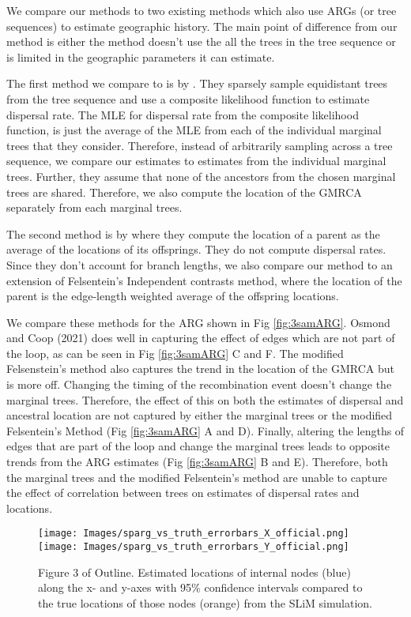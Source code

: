 We compare our methods to two existing methods which also use ARGs (or tree sequences) to estimate geographic history. The main point of difference from our method is either the method doesn't use the all the trees in the tree sequence or is limited in the geographic parameters it can estimate. 

The first method we compare to is by \cite{Osmond2021}. They sparsely sample equidistant trees from the tree sequence and use a composite likelihood function to estimate dispersal rate. The MLE for dispersal rate from the composite likelihood function, is just the average of the MLE from each of the individual marginal trees that they consider. Therefore, instead of arbitrarily sampling across a tree sequence, we compare our estimates to estimates from the individual marginal trees. Further, they assume that none of the ancestors from the chosen marginal trees are shared. Therefore, we also compute the location of the GMRCA separately from each marginal trees. 

The second method is by \cite{Wohns2022} where they compute the location of a parent as the average of the locations of its offsprings. They do not compute dispersal rates. Since they don't account for branch lengths, we also compare our method to an extension of Felsentein's Independent contrasts method, where the location of the parent is the edge-length weighted average of the offspring locations. 

We compare these methods for the ARG shown in Fig \ref{fig:3samARG}. Osmond and Coop (2021) does well in capturing the effect of edges which are not part of the loop, as can be seen in Fig \ref{fig:3samARG} C and F. The modified Felsenstein's method also captures the trend in the location of the GMRCA but is more off. Changing the timing of the recombination event doesn't change the marginal trees. Therefore, the effect of this on both the estimates of dispersal and ancestral location are not captured by either the marginal trees or the modified Felsentein's Method (Fig \ref{fig:3samARG} A and D). Finally, altering the lengths of edges that are part of the loop and change the marginal trees leads to opposite trends from the ARG estimates (Fig \ref{fig:3samARG} B and E). Therefore, both the marginal trees and the modified Felsentein's method are unable to capture the effect of correlation between trees on estimates of dispersal rates and locations.

\begin{figure}[H]
    \centering
    \texttt{[image: Images/sparg\_vs\_truth\_errorbars\_X\_official.png]}
    \texttt{[image: Images/sparg\_vs\_truth\_errorbars\_Y\_official.png]}
    \caption{ Figure 3 of Outline. Estimated locations of internal nodes (blue) along the x- and y-axes with 95\% confidence intervals compared to the true locations of those nodes (orange) from the SLiM simulation. }
    \label{fig:ancestral_locations_plots}
\end{figure}

